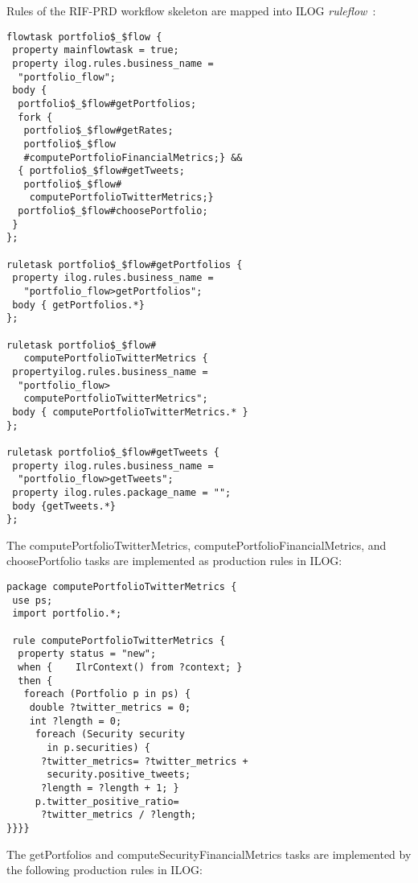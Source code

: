 \begin{multicols}{2}
{  Rules of the RIF-PRD workflow skeleton are mapped into ILOG
\textit{ruleflow}~\cite{25-kal}:

\vspace*{-6pt}

\noindent
  \begin{verbatim}
flowtask portfolio$_$flow {
 property mainflowtask = true;
 property ilog.rules.business_name =
  "portfolio_flow";
 body {
  portfolio$_$flow#getPortfolios;
  fork {
   portfolio$_$flow#getRates;
   portfolio$_$flow
   #computePortfolioFinancialMetrics;} &&
  { portfolio$_$flow#getTweets;
   portfolio$_$flow#
    computePortfolioTwitterMetrics;}
  portfolio$_$flow#choosePortfolio;
 }
};

ruletask portfolio$_$flow#getPortfolios {
 property ilog.rules.business_name =
   "portfolio_flow>getPortfolios";
 body { getPortfolios.*}
};

ruletask portfolio$_$flow#
   computePortfolioTwitterMetrics {
 propertyilog.rules.business_name =
  "portfolio_flow>
   computePortfolioTwitterMetrics";
 body { computePortfolioTwitterMetrics.* }
};

ruletask portfolio$_$flow#getTweets {
 property ilog.rules.business_name =
  "portfolio_flow>getTweets";
 property ilog.rules.package_name = "";
 body {getTweets.*}
};
\end{verbatim}

  The {\sf computePortfolioTwitterMetrics},
{\sf computePortfolioFinancialMetrics}, and {\sf choosePortfolio} tasks are
implemented as production rules in ILOG:

\vspace*{-6pt}

\noindent
  \begin{verbatim}
package computePortfolioTwitterMetrics {
 use ps;
 import portfolio.*;

 rule computePortfolioTwitterMetrics {
  property status = "new";
  when {	IlrContext() from ?context;	}
  then {
   foreach (Portfolio p in ps) {
    double ?twitter_metrics = 0;
    int ?length = 0;
     foreach (Security security
       in p.securities) {
      ?twitter_metrics= ?twitter_metrics +
       security.positive_tweets;
      ?length = ?length + 1; }
     p.twitter_positive_ratio=
      ?twitter_metrics / ?length;
}}}}
\end{verbatim}

  The {\sf getPortfolios} and {\sf computeSecurityFinancialMetrics} tasks are
implemented by the following production rules in ILOG:


}
\end{multicols}
